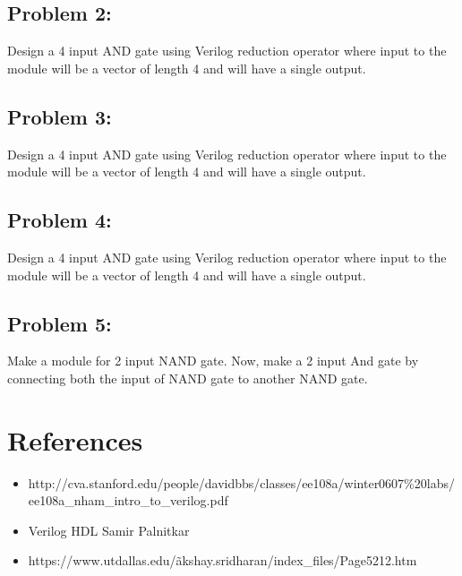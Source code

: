 \documentclass[a4paper,10pt]{article}
\theoremstyle{mytheor}
\begin{document}
\subsection*{Problem 2:}
Design a 4 input AND gate using Verilog reduction operator where input to the module will be a vector of length 4 and will have a single output.
\subsection*{Problem 3:}
Design a 4 input AND gate using Verilog reduction operator where input to the module will be a vector of length 4 and will have a single output.
\subsection*{Problem 4:}
Design a 4 input AND gate using Verilog reduction operator where input to the module will be a vector of length 4 and will have a single output.
\subsection*{Problem 5:}
Make a module for 2 input NAND gate. Now, make a 2 input And gate by connecting both the input of NAND gate to another NAND gate.


\section*{References}
\begin{itemize}
  \item http://cva.stanford.edu/people/davidbbs/classes/ee108a/winter0607\%20labs/ee108a\_nham\_intro\_to\_verilog.pdf
  \item Verilog HDL \- Samir Palnitkar
  \item https://www.utdallas.edu/\~akshay.sridharan/index\_files/Page5212.htm
\end{itemize}
\end{document}
